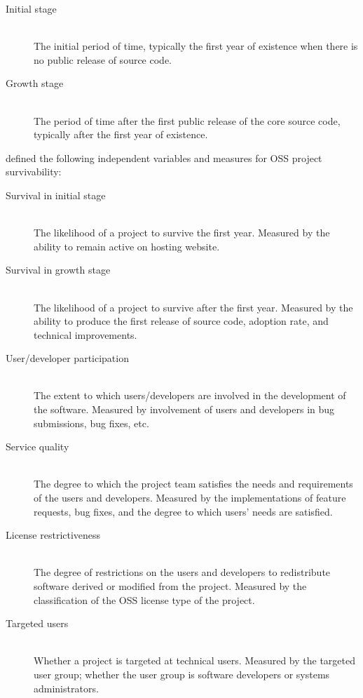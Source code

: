 \begin{description}
	\item[Initial stage] \hfill \\ The initial period of time, typically the first
		year of existence when there is no public release of source code.
	
	\item[Growth stage] \hfill \\ The period of time after the first public release
		of the core source code, typically after the first year of existence.
\end{description}

\noindent
\citeauthor{wang2012} defined the following independent variables and
measures for OSS project survivability:

\begin{description}
	\item[Survival in initial stage] \hfill \\ The likelihood of a project to
		survive the first year. Measured by the ability to remain active on hosting
		website.

	\item[Survival in growth stage] \hfill \\ The likelihood of a project to
		survive after the first year. Measured by the ability to produce the first
		release of source code, adoption rate, and technical improvements.

	\item[User/developer participation] \hfill \\ The extent to which
		users/developers are involved in the development of the software. Measured by
		involvement of users and developers in bug submissions, bug fixes, etc.

	\item[Service quality] \hfill \\ The degree to which the project team satisfies
		the needs and requirements of the users and developers. Measured by the
		implementations of feature requests, bug fixes, and the degree to which users'
		needs are satisfied.

	\item[License restrictiveness] \hfill \\ The degree of restrictions on the
		users and developers to redistribute software derived or modified from the
		project. Measured by the classification of the OSS license type of the
		project.

	\item[Targeted users] \hfill \\ Whether a project is targeted at technical
		users. Measured by the targeted user group; whether the user group is software
		developers or systems administrators.


\end{description}

